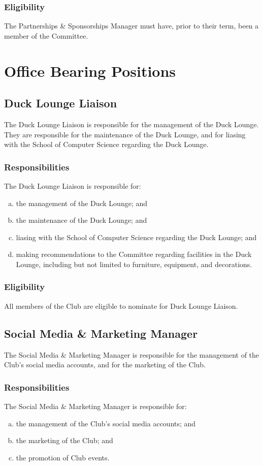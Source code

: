 \documentclass[11pt]{report}
\begin{document}
\subsection{Eligibility}
The Partnerships \& Sponsorships Manager must have, prior to their term, been a member of the Committee.

\chapter{Office Bearing Positions}
\section{Duck Lounge Liaison}
The Duck Lounge Liaison is responsible for the management of the Duck Lounge. They are responsible for the maintenance of the Duck Lounge, and for liasing with the School of Computer Science regarding the Duck Lounge.
\subsection{Responsibilities}
The Duck Lounge Liaison is responsible for:
\begin{enumerate}[(a)]
    \item the management of the Duck Lounge; and
    \item the maintenance of the Duck Lounge; and
    \item liasing with the School of Computer Science regarding the Duck Lounge; and
    \item making recommendations to the Committee regarding facilities in the Duck Lounge, including but not limited to furniture, equipment, and decorations.
\end{enumerate}
\subsection{Eligibility}
All members of the Club are eligible to nominate for Duck Lounge Liaison.

\section{Social Media \& Marketing Manager}
The Social Media \& Marketing Manager is responsible for the management of the Club's social media accounts, and for the marketing of the Club.
\subsection{Responsibilities}
The Social Media \& Marketing Manager is responsible for:
\begin{enumerate}[(a)]
    \item the management of the Club's social media accounts; and
    \item the marketing of the Club; and
    \item the promotion of Club events.
\end{enumerate}
\end{document}
